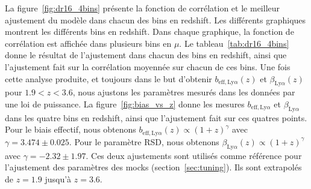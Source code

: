 La figure~\ref{fig:dr16_4bins} présente la fonction de corrélation et le meilleur ajustement du modèle dans chacun des bins en redshift. Les différents graphiques montrent les différents bins en redshift. Dans chaque graphique, la fonction de corrélation est affichée dans plusieurs bins en $\mu$. Le tableau~\ref{tab:dr16_4bins} donne le résultat de l'ajustement dans chacun des bins en redshift, ainsi que l'ajustement fait sur la corrélation moyennée sur chacun de ces bins.
Une fois cette analyse produite, et toujours dans le but d'obtenir $b_{\mathrm{eff},\mathrm{Ly}\alpha}(z)$ et $\beta_{\mathrm{Ly}\alpha}(z)$ pour $\num{1.9} < z  < \num{3.6}$, nous ajustons les paramètres \lya{} mesurés dans les données par une loi de puissance. La figure~\ref{fig:bias_vs_z} donne les mesures $b_{\mathrm{eff},\mathrm{Ly}\alpha}$ et $\beta_{\mathrm{Ly}\alpha}$ dans les quatre bins en redshift, ainsi que l'ajustement fait sur ces quatres points. Pour le biais effectif, nous obtenons $b_{\mathrm{eff},\mathrm{Ly}\alpha}(z) \propto (1+z)^{\gamma}$ avec $\gamma = \num{3.474} \pm \num{0.025}$. Pour le paramètre RSD, nous obtenons $\beta_{\mathrm{Ly}\alpha}(z) \propto (1+z)^{\gamma}$ avec $\gamma = - \num{2.32} \pm \num{1.97}$. Ces deux ajustements sont utilisés comme référence pour l'ajustement des paramètres des mocks (section~\ref{sec:tuning}). Ils sont extrapolés de $z = \num{1.9}$ jusqu'à $z = \num{3.6}$.


